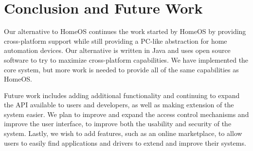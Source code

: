 \section{Conclusion and Future Work}
\label{sec:future}
Our alternative to HomeOS continues the work started by HomeOS by providing
cross-platform support while still providing a PC-like abstraction for home
automation devices. Our alternative is written in Java and uses open source
software to try to maximize cross-platform capabilities. We have implemented the
core system, but more work is needed to provide all of the same capabilities as
HomeOS.

Future work includes adding additional functionality and continuing to expand
the API available to users and developers, as well as making extension of the
system easier. We plan to improve and expand the access control mechanisms and
improve the user interface, to improve both the usability and security of the
system. Lastly, we wish to add features, such as an online marketplace, to allow
users to easily find applications and drivers to extend and improve their
systems.
